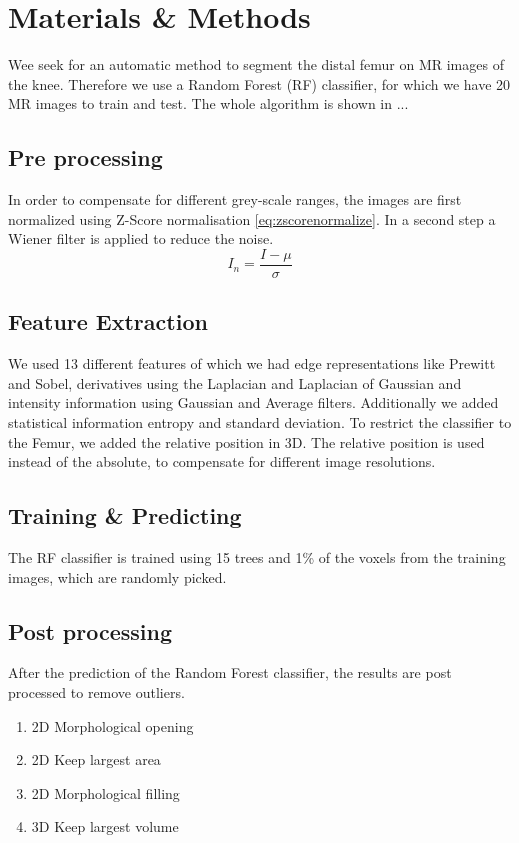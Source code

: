 \section{Materials \& Methods}
Wee seek for an automatic method to segment the distal femur on MR images of the knee. Therefore we use a Random Forest (RF) classifier, for which we have 20 MR images to train and test. The whole algorithm is shown in ...
\subsection{Pre processing}
In order to compensate for different grey-scale ranges, the images are first normalized using Z-Score normalisation \autoref{eq:zscorenormalize}. In a second step a Wiener filter is applied to reduce the noise. 
\begin{equation}
I_n = \frac{I - \mu}{\sigma}
\label{eq:zscorenormalize}
\end{equation}
\subsection{Feature Extraction}
We used 13 different features of which we had edge representations like Prewitt and Sobel, derivatives using the Laplacian and Laplacian of Gaussian and intensity information using Gaussian and Average filters. Additionally we added statistical information entropy and standard deviation. To restrict the classifier to the Femur, we added the relative position in 3D. The relative position is used instead of the absolute, to compensate for different image resolutions.
\subsection{Training \& Predicting}
The RF classifier is trained using 15 trees and 1\% of the voxels from the training images, which are randomly picked. 
\subsection{Post processing}
After the prediction of the Random Forest classifier, the results are post processed to remove outliers. 
\begin{enumerate}
\item 2D Morphological opening
\item 2D Keep largest area
\item 2D Morphological filling
\item 3D Keep largest volume
\end{enumerate}

